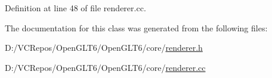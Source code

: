 Definition at line 48 of file renderer.\+cc.



The documentation for this class was generated from the following files\+:\begin{DoxyCompactItemize}
\item 
D\+:/\+V\+C\+Repos/\+Open\+G\+L\+T6/\+Open\+G\+L\+T6/core/\mbox{\hyperlink{renderer_8h}{renderer.\+h}}\item 
D\+:/\+V\+C\+Repos/\+Open\+G\+L\+T6/\+Open\+G\+L\+T6/core/\mbox{\hyperlink{renderer_8cc}{renderer.\+cc}}\end{DoxyCompactItemize}
